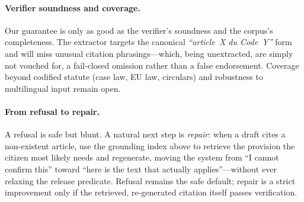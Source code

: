 \paragraph{Verifier soundness and coverage.}
Our guarantee is only as good as the verifier's soundness and the corpus's
completeness. The extractor targets the canonical \emph{``article~X du
Code~Y''} form and will miss unusual citation phrasings---which, being
unextracted, are simply not vouched for, a fail-closed omission rather than a
false endorsement. Coverage beyond codified statute (case law, EU law,
circulars) and robustness to multilingual input remain open.

\paragraph{From refusal to repair.}
A refusal is safe but blunt. A natural next step is \emph{repair}: when a draft
cites a non-existent article, use the grounding index above to retrieve the
provision the citizen most likely needs and regenerate, moving the system from
``I cannot confirm this'' toward ``here is the text that actually
applies''---without ever relaxing the release predicate. Refusal remains the
safe default; repair is a strict improvement only if the retrieved,
re-generated citation itself passes verification.
